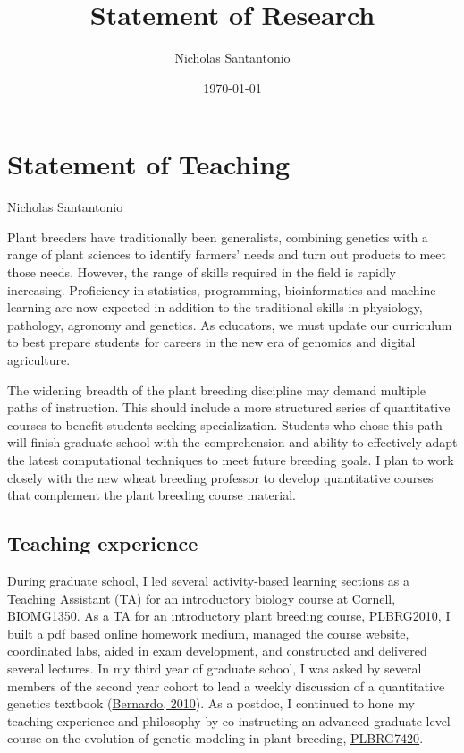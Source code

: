 \documentclass[11pt]{article}
\title{Statement of Research}
\author{Nicholas Santantonio}
\date{\today}
\begin{document}
\section*{\centering Statement of Teaching}
\begin{center} Nicholas Santantonio \end{center}

\noindent Plant breeders have traditionally been generalists, combining genetics with a range of plant sciences to identify farmers' needs and turn out products to meet those needs. However, the range of skills required in the field is rapidly increasing. Proficiency in statistics, programming, bioinformatics and machine learning are now expected in addition to the traditional skills in physiology, pathology, agronomy and genetics. As educators, we must update our curriculum to best prepare students for careers in the new era of genomics and digital agriculture. 

The widening breadth of the plant breeding discipline may demand multiple paths of instruction. This should include a more structured series of quantitative courses to benefit students seeking specialization. Students who chose this path will finish graduate school with the comprehension and ability to effectively adapt the latest computational techniques to meet future breeding goals. I plan to work closely with the new wheat breeding professor to develop quantitative courses that complement the plant breeding course material.

\subsection*{Teaching experience}

During graduate school, I led several activity-based learning sections as a Teaching Assistant (TA) for an introductory biology course at Cornell, \href{https://classes.cornell.edu/browse/roster/SP19/class/BIOMG/1350}{BIOMG1350}. As a TA for an introductory plant breeding course, \href{https://classes.cornell.edu/browse/roster/FA17/class/PLBRG/2010}{PLBRG2010}, I built a pdf based online homework medium, managed the course website, coordinated labs, aided in exam development, and constructed and delivered several lectures. In my third year of graduate school, I was asked by several members of the second year cohort to lead a weekly discussion of a quantitative genetics textbook (\href{http://stemmapress.com/}{Bernardo, 2010}). As a postdoc, I continued to hone my teaching experience and philosophy by co-instructing an advanced graduate-level course on the evolution of genetic modeling in plant breeding, \href{https://classes.cornell.edu/browse/roster/FA19/class/PLBRG/7420}{PLBRG7420}.
\end{document}
